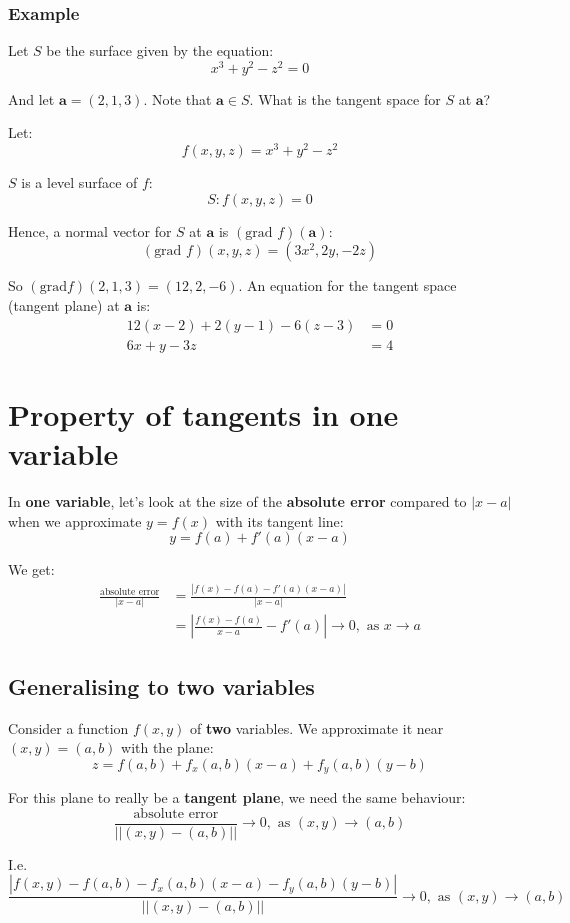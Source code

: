 \documentclass[11pt]{article}
\begin{document}
\subsubsection{Example}
\label{sec:orgabbff82}
Let \(S\) be the surface given by the equation:
\[x^3 + y^2 - z^2 = 0\]

And let \(\boldsymbol{a} = (2, 1, 3)\). Note that \(\boldsymbol{a} \in S\). What is the tangent space for \(S\) at \(\boldsymbol{a}\)?


Let:
\[f(x, y, z) = x^3 + y^2 - z^2\]

\(S\) is a level surface of \(f\):
\[S: f(x, y, z) = 0\]

Hence, a normal vector for \(S\) at \(\boldsymbol{a}\) is \((\text{grad } f)(\boldsymbol{a})\):
\[(\text{grad } f)(x, y, z) = (3x^2, 2y, -2z)\]

So \((\text{grad} f)(2, 1, 3) = (12, 2, -6)\). An equation for the tangent space (tangent plane) at \(\boldsymbol{a}\) is:
\begin{align*}
12(x - 2) + 2(y - 1) - 6(z - 3) &= 0 \\
6x + y - 3z &= 4
\end{align*}
\section{Property of tangents in one variable}
\label{sec:org2b9ac7d}
In \textbf{one variable}, let's look at the size of the \textbf{absolute error} compared to \(|x - a|\) when we approximate \(y = f(x)\) with its tangent line:
\[y = f(a) + f'(a)(x - a)\]

We get:
\begin{align*}
\frac{\text{absolute error}}{|x - a|} &= \frac{|f(x) - f(a) - f'(a) (x - a)|}{|x - a|} \\
&= \left| \frac{f(x) - f(a)}{x - a} - f'(a) \right| \rightarrow 0, \text{ as } x \rightarrow a
\end{align*}
\subsection{Generalising to two variables}
\label{sec:org5e3458b}
Consider a function \(f(x, y)\) of \textbf{two} variables. We approximate it near \((x, y) = (a, b)\) with the plane:
\[z = f(a, b) + f_x(a, b) (x - a) + f_y (a, b) (y - b)\]

For this plane to really be a \textbf{tangent plane}, we need the same behaviour:
\[\frac{\text{absolute error}}{||(x, y) - (a, b)||} \rightarrow 0, \text{ as } (x, y) \rightarrow (a, b)\]

I.e.
\[\frac{|f(x, y) - f(a, b) - f_x(a, b) (x - a) - f_y(a, b) (y - b)|}{||(x, y) - (a, b)||} \rightarrow 0, \text{ as } (x, y) \rightarrow (a, b)\]
\end{document}
